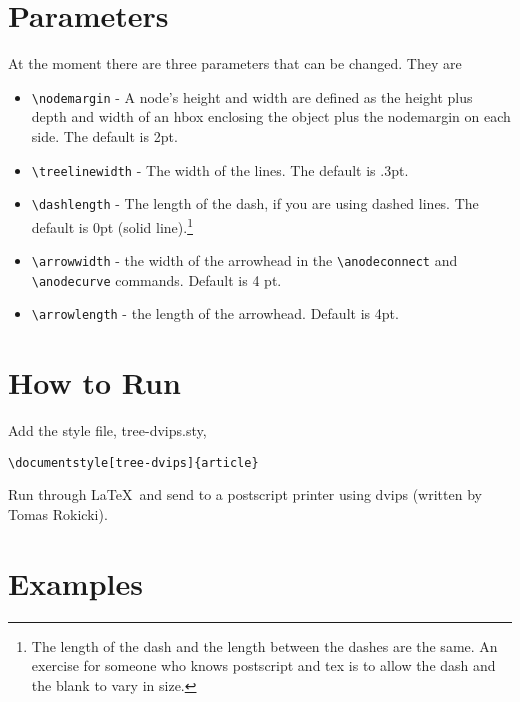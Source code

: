 \section{Parameters}

At the moment there are three parameters that can be changed.  They
are
\begin{itemize}
\item \verb+\nodemargin+ - A node's height and width are defined as
the height plus depth and width of an hbox enclosing the object plus the
nodemargin on each side.  The default is 2pt.

\item \verb+\treelinewidth+ - The width of the lines. The default is .3pt.

\item \verb+\dashlength+ - The length of the dash, if you are using
dashed lines.   The default is 0pt (solid line).\footnote{The length
of the dash and the length between the dashes are the same.  An
exercise for someone who knows postscript and tex is to allow the dash
and the blank to vary in size.}

\item \verb+\arrowwidth+ - the width of the arrowhead in the
      \verb+\anodeconnect+ and \verb+\anodecurve+ commands. Default is
      4 pt.

\item \verb+\arrowlength+ - the length of the arrowhead.  Default is
      4pt. 

\end{itemize}


\section{How to Run}

Add the style file, tree-dvips.sty, 
\begin{verbatim}
\documentstyle[tree-dvips]{article}
\end{verbatim}
Run through \LaTeX\ and send to a postscript printer using dvips
(written by Tomas Rokicki).


\section{Examples}

